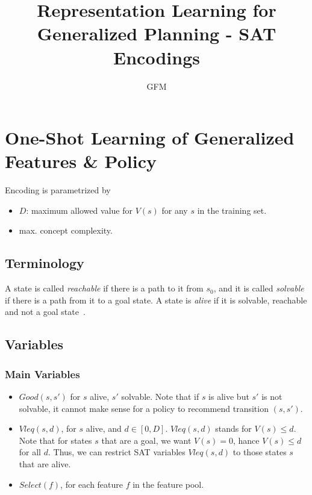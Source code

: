 \documentclass[a4paper]{article}
\title{Representation Learning for Generalized Planning - SAT Encodings}
\author{GFM}
\begin{document}
\maketitle

\section{One-Shot Learning of Generalized Features \& Policy}

Encoding is parametrized by
\begin{itemize}
 \item $D$: maximum allowed value for $V(s)$ for any $s$ in the training set.
 \item max. concept complexity.
\end{itemize}


\subsection{Terminology}
A state is called \emph{reachable} if there is a path to it from $s_0$, and
it is called \emph{solvable} if there is a path from it to a goal
state.
A state is \emph{alive} if it is solvable, reachable and not a
goal state~\cite{frances-et-al-ijcai2019}.


\subsection{Variables}

\subsubsection{Main Variables}
\begin{itemize}
 \item $Good(s, s')$ for $s$ alive, $s'$ solvable.
 Note that if $s$ is alive but $s'$ is not solvable,
 it cannot make sense for a policy to recommend transition $(s, s')$.

 \item $Vleq(s, d)$, for $s$ alive, and $d \in [0, D]$.
 $Vleq(s, d)$ stands for $V(s) \leq d$.
 Note that for states $s$ that are a goal, we want $V(s)=0$, hance $V(s)\leq d$ for all $d$.
 Thus, we can restrict SAT variables $Vleq(s, d)$ to those states $s$ that are alive.

 \item $Select(f)$, for each feature $f$ in the feature pool.
\end{itemize}
\end{document}
